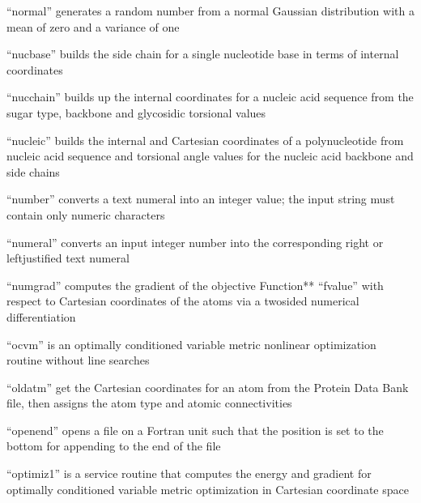 \documentclass[letterpaper,11pt,english]{sphinxmanual}
\begin{document}
“normal” generates a random number from a normal Gaussian distribution with a mean of zero and a variance of one


“nucbase” builds the side chain for a single nucleotide base in terms of internal coordinates


“nucchain” builds up the internal coordinates for a nucleic acid sequence from the sugar type, backbone and glycosidic torsional values


“nucleic” builds the internal and Cartesian coordinates of a polynucleotide from nucleic acid sequence and torsional angle values for the nucleic acid backbone and side chains


“number” converts a text numeral into an integer value; the input string must contain only numeric characters


“numeral” converts an input integer number into the corresponding right\sphinxhyphen{} or left\sphinxhyphen{}justified text numeral


“numgrad” computes the gradient of the objective Function** “fvalue” with respect to Cartesian coordinates of the atoms via a two\sphinxhyphen{}sided numerical differentiation


“ocvm” is an optimally conditioned variable metric nonlinear optimization routine without line searches


“oldatm” get the Cartesian coordinates for an atom from the Protein Data Bank file, then assigns the atom type and atomic connectivities


“openend” opens a file on a Fortran unit such that the position is set to the bottom for appending to the end of the file


“optimiz1” is a service routine that computes the energy and gradient for optimally conditioned variable metric optimization in Cartesian coordinate space
\end{document}
